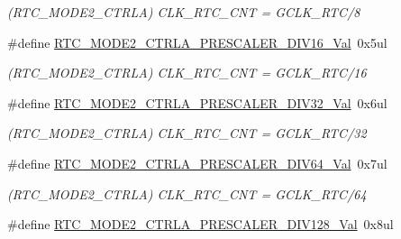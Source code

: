 \begin{DoxyCompactItemize}
\begin{DoxyCompactList}\small\item\em (R\+T\+C\+\_\+\+M\+O\+D\+E2\+\_\+\+C\+T\+R\+L\+A) C\+L\+K\+\_\+\+R\+T\+C\+\_\+\+C\+N\+T = G\+C\+L\+K\+\_\+\+R\+T\+C/8 \end{DoxyCompactList}\item 
\hypertarget{group___s_a_m_l21___r_t_c_ga5b2c19e964c1bfafba111fde43ba2796}{}\#define \hyperlink{group___s_a_m_l21___r_t_c_ga5b2c19e964c1bfafba111fde43ba2796}{R\+T\+C\+\_\+\+M\+O\+D\+E2\+\_\+\+C\+T\+R\+L\+A\+\_\+\+P\+R\+E\+S\+C\+A\+L\+E\+R\+\_\+\+D\+I\+V16\+\_\+\+Val}~0x5ul\label{group___s_a_m_l21___r_t_c_ga5b2c19e964c1bfafba111fde43ba2796}

\begin{DoxyCompactList}\small\item\em (R\+T\+C\+\_\+\+M\+O\+D\+E2\+\_\+\+C\+T\+R\+L\+A) C\+L\+K\+\_\+\+R\+T\+C\+\_\+\+C\+N\+T = G\+C\+L\+K\+\_\+\+R\+T\+C/16 \end{DoxyCompactList}\item 
\hypertarget{group___s_a_m_l21___r_t_c_ga20825b05f4fb2a2ba8f28e680e68e27d}{}\#define \hyperlink{group___s_a_m_l21___r_t_c_ga20825b05f4fb2a2ba8f28e680e68e27d}{R\+T\+C\+\_\+\+M\+O\+D\+E2\+\_\+\+C\+T\+R\+L\+A\+\_\+\+P\+R\+E\+S\+C\+A\+L\+E\+R\+\_\+\+D\+I\+V32\+\_\+\+Val}~0x6ul\label{group___s_a_m_l21___r_t_c_ga20825b05f4fb2a2ba8f28e680e68e27d}

\begin{DoxyCompactList}\small\item\em (R\+T\+C\+\_\+\+M\+O\+D\+E2\+\_\+\+C\+T\+R\+L\+A) C\+L\+K\+\_\+\+R\+T\+C\+\_\+\+C\+N\+T = G\+C\+L\+K\+\_\+\+R\+T\+C/32 \end{DoxyCompactList}\item 
\hypertarget{group___s_a_m_l21___r_t_c_ga07d7831d434d5ff93490902f9d32503b}{}\#define \hyperlink{group___s_a_m_l21___r_t_c_ga07d7831d434d5ff93490902f9d32503b}{R\+T\+C\+\_\+\+M\+O\+D\+E2\+\_\+\+C\+T\+R\+L\+A\+\_\+\+P\+R\+E\+S\+C\+A\+L\+E\+R\+\_\+\+D\+I\+V64\+\_\+\+Val}~0x7ul\label{group___s_a_m_l21___r_t_c_ga07d7831d434d5ff93490902f9d32503b}

\begin{DoxyCompactList}\small\item\em (R\+T\+C\+\_\+\+M\+O\+D\+E2\+\_\+\+C\+T\+R\+L\+A) C\+L\+K\+\_\+\+R\+T\+C\+\_\+\+C\+N\+T = G\+C\+L\+K\+\_\+\+R\+T\+C/64 \end{DoxyCompactList}\item 
\hypertarget{group___s_a_m_l21___r_t_c_ga1fedec5db921fce3c06f6b573b3ebd2e}{}\#define \hyperlink{group___s_a_m_l21___r_t_c_ga1fedec5db921fce3c06f6b573b3ebd2e}{R\+T\+C\+\_\+\+M\+O\+D\+E2\+\_\+\+C\+T\+R\+L\+A\+\_\+\+P\+R\+E\+S\+C\+A\+L\+E\+R\+\_\+\+D\+I\+V128\+\_\+\+Val}~0x8ul\label{group___s_a_m_l21___r_t_c_ga1fedec5db921fce3c06f6b573b3ebd2e}


\end{DoxyCompactItemize}
